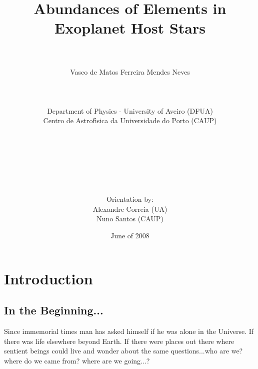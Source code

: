 \documentclass[dvips,12pt,a4paper]{report}
\title{Abundances of Elements in Exoplanet Host Stars}
\author{\\
\\
Vasco de Matos Ferreira Mendes Neves \\ [4mm]
\\
\\
\\
Department of Physics - University of Aveiro (DFUA) \\
Centro de Astrof\'{\i}sica da Universidade do Porto (CAUP) \\
\\
\\
\\
\\
\\
\\
\\
Orientation by:\\
Alexandre Correia (UA) \\ Nuno Santos (CAUP)}
\date{June of 2008}
\begin{document}
\maketitle
\newpage
{}
\tableofcontents
\newpage
{}


\chapter{Introduction}
\cfoot{ { \thepage} }
\pagestyle{fancy}
\section{In the Beginning...}

Since immemorial times man has asked himself if he was alone in the Universe. If there was life elsewhere beyond Earth. If there were places out there where sentient beings could live and wonder about the same questions...who are we? where do we came from? where are we going...?
\end{document}
